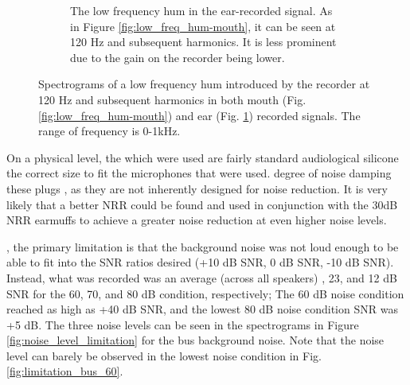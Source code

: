 \begin{figure}[h]
\begin{subfigure}{0.475\textwidth}
  \caption{The low frequency hum in the ear-recorded signal. As in Figure \ref{fig:low_freq_hum-mouth}, it can be seen at 120 Hz and subsequent harmonics.  It is less prominent \DIFaddbeginFL {}\DIFaddendFL due to the gain on the recorder being lower.}
  \label{fig:low_freq_hum-ear}
\end{subfigure}
\caption{Spectrograms of a low frequency hum introduced by the recorder at 120 Hz and subsequent harmonics in both mouth (Fig. \ref{fig:low_freq_hum-mouth}) and ear (Fig. \ref{fig:low_freq_hum-ear}) recorded signals. The range of frequency is 0-1kHz.}
\label{fig:low_freq_hum}
\end{figure}

On a physical level, the \DIFdelbegin {}\DIFdelend \DIFaddbegin {}\DIFaddend which were used are fairly standard audiological silicone \DIFdelbegin {}\DIFdelend \DIFaddbegin {}\DIFaddend the correct size to fit the microphones that were used.  \DIFdelbegin {}\DIFdelend \DIFaddbegin {}\DIFaddend degree of noise damping these plugs \DIFdelbegin {}\DIFdelend \DIFaddbegin {}\DIFaddend , as they are not inherently designed for noise reduction.  It is very likely that a better NRR \DIFdelbegin {}\DIFdelend \DIFaddbegin {}\DIFaddend could be found and used in conjunction with the 30dB NRR earmuffs to achieve a greater noise reduction at even higher noise levels.

\DIFdelbegin {}\DIFdelend \DIFaddbegin {}\DIFaddend , the primary limitation is that the background noise was not loud enough to be able to fit into the SNR ratios desired (+10 dB SNR, 0 dB SNR, -10 dB SNR).  Instead, what was recorded was an average (across all speakers) \DIFaddbegin {}, 23, and 12 dB SNR for the 60, 70, and 80 dB condition, respectively; The 60 dB noise condition reached as high as +40 dB SNR, and the lowest 80 dB noise condition SNR was +5 dB. The three noise levels can be seen in the spectrograms in Figure \ref{fig:noise_level_limitation} for the bus background noise.  Note that the noise level can barely be observed in the lowest noise condition in Fig. \ref{fig:limitation_bus_60}.

